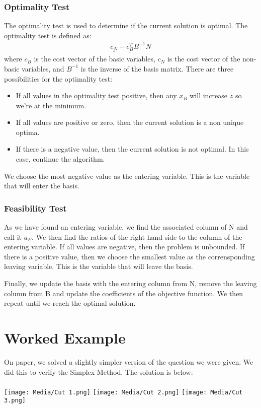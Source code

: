 \documentclass{article}
\numberwithin{equation}{section}
\begin{document}
\subsubsection{Optimality Test}
The optimality test is used to determine if the current solution is optimal. The optimality test is defined as:
\begin{align}
    \underline{c_N} - \underline{c_B^T} B^{-1} N 
\end{align}
where $c_B$ is the cost vector of the basic variables, $c_N$ is the cost vector of the non-basic variables, and $B^{-1}$ is the inverse of the basis matrix.
There are three possibilities for the optimality test:
\begin{itemize}
    \item If all values in the optimality test positive, then any $x_B$ will increase $z$ so we're at the minimum.
    \item If all values are positive or zero, then the current solution is a non unique optima.
    \item If there is a negative value, then the current solution is not optimal. In this case, continue the algorithm.
\end{itemize}
We choose the most negative value as the entering variable. This is the variable that will enter the basis.
\subsubsection{Feasibility Test}
As we have found an entering variable, we find the associated column of N and call it $a_E$. We then find the ratios of the right hand side to the column of the entering variable. If all values are negative, then the problem is unbounded. If there is a positive value, then we choose the smallest value as the corrensponding leaving variable. This is the variable that will leave the basis.

Finally, we update the basis with the entering column from N, remove the leaving column from B and update the coefficients of the objective function. We then repeat until we reach the optimal solution.

\newpage
\section{Worked Example}
On paper, we solved a slightly simpler version of the question we were given. We did this to verify the Simplex Method. The solution is below: \\ \\
\texttt{[image: Media/Cut 1.png]}
\texttt{[image: Media/Cut 2.png]}
\texttt{[image: Media/Cut 3.png]}
\newpage
\end{document}
